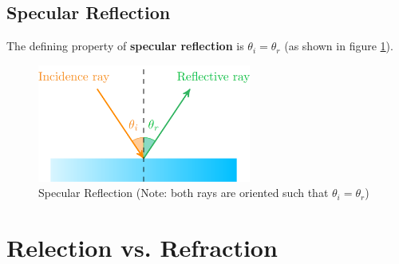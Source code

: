 \documentclass[a4paper]{article}
\begin{document}
\subsection*{Specular Reflection}
The defining property of \textbf{specular reflection} is $\theta_i = \theta_r$ (as shown in figure \ref{fig:spec_reflec}). 
\begin{figure}[htp!]
        \centering
        \includegraphics[width=7cm]{specular_reflection.png}
        \caption{Specular Reflection (Note: both rays are oriented such that $\theta_i = \theta_r$)}
        \label{fig:spec_reflec}
\end{figure}
\section*{Relection vs. Refraction}
\end{document}
